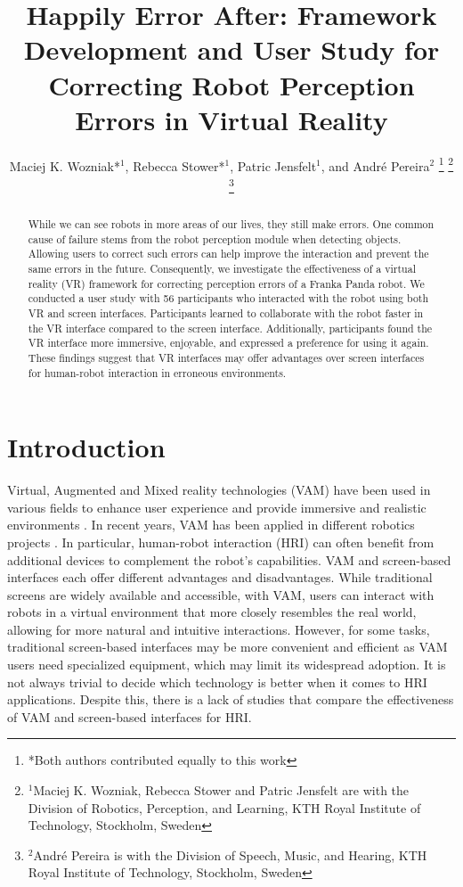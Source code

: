 \documentclass[letterpaper, 10 pt, conference]{ieeeconf}  %
\title{\LARGE \bf
Happily Error After: Framework Development and User Study for Correcting Robot Perception Errors in Virtual Reality 
}
\author{Maciej K. Wozniak*$^{1}$, Rebecca Stower*$^{1}$, Patric Jensfelt$^{1}$, and André Pereira$^{2}$%
\thanks{*Both authors contributed equally to this work}%
\thanks{$^{1}$Maciej K. Wozniak, Rebecca Stower and Patric Jensfelt are with the Division of Robotics, Perception, and Learning, KTH Royal Institute of Technology, Stockholm, Sweden}
\thanks{$^{2}$André Pereira is with the Division of Speech, Music, and Hearing, KTH Royal Institute of Technology, Stockholm, Sweden}%
}
\begin{document}
\maketitle
\thispagestyle{empty}
\pagestyle{empty}


\begin{abstract}
While we can see robots in more areas of our lives, they still make errors. One common cause of failure stems from the robot perception module when detecting objects. Allowing users to correct such errors can help improve the interaction and prevent the same errors in the future. Consequently, we investigate the effectiveness of a virtual reality (VR) framework for correcting perception errors of a Franka Panda robot. We conducted a user study with 56 participants who interacted with the robot using both VR and screen interfaces. Participants learned to collaborate with the robot faster in the VR interface compared to the screen interface. Additionally, participants found the VR interface more immersive, enjoyable, and expressed a preference for using it again. These findings suggest that VR interfaces may offer advantages over screen interfaces for human-robot interaction in erroneous environments.
\end{abstract}

\maketitle
\thispagestyle{empty}
\pagestyle{empty}




\section{Introduction}
\label{sec:intro}



Virtual, Augmented and Mixed reality technologies (VAM) have been used in various fields to enhance user experience and provide immersive and realistic environments \cite{roldan2017multi}. In recent years, VAM has been applied in different robotics projects \cite{wozniak2023virtual}. In particular, human-robot interaction (HRI) can often benefit from additional devices to complement the robot's capabilities. VAM and screen-based interfaces each offer different advantages and disadvantages. While traditional screens are widely available and accessible, with VAM, users can interact with robots in a virtual environment that more closely resembles the real world, allowing for more natural and intuitive interactions. However, for some tasks, traditional screen-based interfaces may be more convenient and efficient as VAM users need specialized equipment, which may limit its widespread adoption. It is not always trivial to decide which technology is better when it comes to HRI applications. Despite this, there is a lack of studies that compare the effectiveness of VAM and screen-based interfaces for HRI. 
\end{document}

